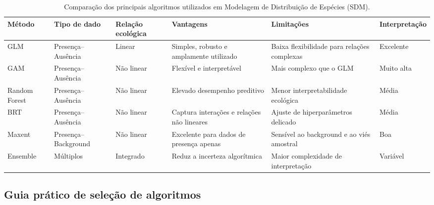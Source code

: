 \begin{table}[H]
	\centering
	\caption{Comparação dos principais algoritmos utilizados em Modelagem de Distribuição de Espécies (SDM).}
	\label{tab:comparacao_algoritmos_sdm}
	
	\scriptsize
	
	\begin{tabular}{
			p{}
			p{}
			p{}
			p{}
			p{}
			p{}
		}
		
		\toprule
		\textbf{Método} &
		\textbf{Tipo de dado} &
		\textbf{Relação ecológica} &
		\textbf{Vantagens} &
		\textbf{Limitações} &
		\textbf{Interpretação} \\
		\midrule
		
		GLM &
		Presença--Ausência &
		Linear &
		Simples, robusto e amplamente utilizado &
		Baixa flexibilidade para relações complexas &
		Excelente \\
		
		GAM &
		Presença--Ausência &
		Não linear &
		Flexível e interpretável &
		Mais complexo que o GLM &
		Muito alta \\
		
		Random Forest &
		Presença--Ausência &
		Não linear &
		Elevado desempenho preditivo &
		Menor interpretabilidade ecológica &
		Média \\
		
		BRT &
		Presença--Ausência &
		Não linear &
		Captura interações e relações não lineares &
		Ajuste de hiperparâmetros delicado &
		Média \\
		
		Maxent &
		Presença--Background &
		Não linear &
		Excelente para dados de presença apenas &
		Sensível ao background e ao viés amostral &
		Boa \\
		
		Ensemble &
		Múltiplos &
		Integrado &
		Reduz a incerteza algorítmica &
		Maior complexidade de interpretação &
		Variável \\
		
		\bottomrule
		
	\end{tabular}
	
\end{table}

\subsection*{Guia prático de seleção de algoritmos}

